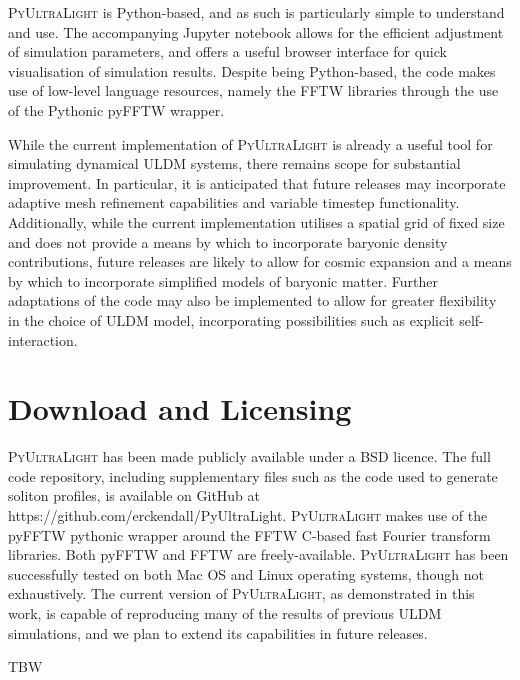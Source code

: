 \documentclass[a4paper,11pt]{article}
\newcommand{\PyUltraLight}{\textsc{PyUltraLight}\xspace}
\begin{document}
\PyUltraLight is Python-based, and as such is particularly simple to understand and use. The accompanying Jupyter notebook allows for the efficient adjustment of simulation parameters, and offers a useful browser interface for quick visualisation of simulation results. Despite being Python-based, the code makes use of low-level language resources, namely the FFTW libraries through the use of the Pythonic pyFFTW wrapper. 

While the current implementation of \PyUltraLight is already a useful tool for simulating dynamical ULDM systems, there remains scope for substantial improvement. In particular, it is anticipated that future releases may incorporate adaptive mesh refinement capabilities and variable timestep functionality. Additionally, while the current implementation utilises a spatial grid of fixed size and does not provide a means by which to incorporate baryonic density contributions, future releases are likely to allow for cosmic expansion and a means by which to incorporate simplified models of baryonic matter. Further adaptations of the code may also be implemented to allow for greater flexibility in the choice of ULDM model, incorporating possibilities such as explicit self-interaction. 





\appendix
\section{Download and Licensing}

\PyUltraLight has been made publicly available under a BSD licence. The full code repository, including supplementary files such as the code used to generate soliton profiles, is available on GitHub at https://github.com/erckendall/PyUltraLight. \PyUltraLight makes use of the pyFFTW pythonic wrapper around the FFTW C-based fast Fourier transform libraries. Both pyFFTW and FFTW are freely-available. \PyUltraLight has been successfully tested on both Mac OS and Linux operating systems, though not exhaustively. The current version of \PyUltraLight, as demonstrated in this work, is capable of reproducing many of the results of previous ULDM simulations, and we plan to extend its capabilities in future releases.  

\acknowledgments

TBW



\end{document}
